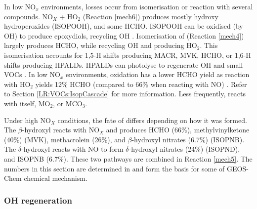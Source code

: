       
      In low NO$_x$ environments, \roo losses occur from isomerisation or reaction with several compounds.
      NO$_X$ + HO$_2$ (Reaction \ref{mech6}) produces mostly hydroxy hydroperoxides (ISOPOOH), and some HCHO.
      ISOPOOH can be oxidised (by OH) to produce epoxydiols, recycling OH \parencite{Paulot2009b}. 
      Isomerisation of \roo (Reaction \ref{mech4}) largely produces HCHO, while recycling OH and producing HO$_2$.
      This isomerisation accounts for 1,5-H shifts producing MACR, MVK, HCHO, or 1,6-H shifts producing HPALDs.
      HPALDs can photolyse to regenerate OH and small VOCs \parencite{Crounse2011,Wolfe2012, Peeters2014}.
      In low NO$_x$ environments, \roo oxidation has a lower HCHO yield as reaction with HO$_2$ yields 12\% HCHO (compared to 66\% when reacting with NO) \parencite{Mao2013}.
      Refer to Section \ref{LR:VOCs:IsopCascade} for more information.
      Less frequently, \roo reacts with itself, MO$_2$, or MCO$_3$.
      
      Under high NO$_X$ conditions, the fate of \roo differs depending on how it was formed.
      The $\beta$-hydroxyl reacts with NO$_X$ and produces HCHO (66\%), methylvinylketone (40\%) (MVK), methacrolein (26\%), and $\beta$-hydroxyl nitrates (6.7\%) (ISOPNB).
      The $\delta$-hydroxyl reacts with NO to form $\delta$-hydroxyl nitrates (24\%) (ISOPND), and ISOPNB (6.7\%).
      These two pathways are combined in Reaction \ref{mech5}. 
      The numbers in this section are determined in \textcite{Mao2013} and form the basis for some of GEOS-Chem chemical mechanism.
      
    \subsubsection{OH regeneration}
      
